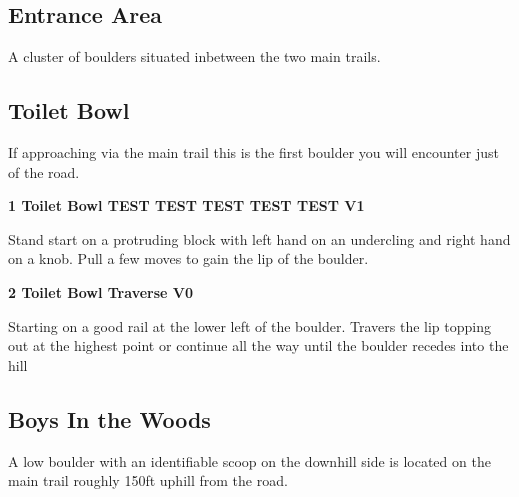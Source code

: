 \begin{multicols}{2}
		\section{Entrance Area}\label{sa:Entrance Area}
	\begin{minipage}{\columnwidth}
	A cluster of boulders situated inbetween the two main trails.
	\end{minipage}

			\subsection*{Toilet Bowl}\label{bf:Toilet Bowl}
			\begin{minipage}{\columnwidth}
			If approaching via the main trail this is the first boulder you will encounter just of the road.
			\end{minipage}
			

					\begin{minipage}{\linewidth}	
					\label{rt:Toilet Bowl TEST TEST TEST TEST TEST}
\colorbox{green!20}{
\textbf{
1 Toilet Bowl TEST TEST TEST TEST TEST V1   
}
}

					\begin{adjustwidth}{0.5cm}{}				
					Stand start on a protruding block with left hand on an undercling and right hand on a knob. Pull a few moves to gain the lip of the boulder.
					\end{adjustwidth}
					\end{minipage}
					\begin{minipage}{\linewidth}	
					\label{rt:Toilet Bowl Traverse}
\colorbox{green!20}{
\textbf{
2 Toilet Bowl Traverse V0    
}
}

					\begin{adjustwidth}{0.5cm}{}				
					Starting on a good rail at the lower left of the boulder. Travers the lip topping out at the highest point or continue all the way until the boulder recedes into the hill
					\end{adjustwidth}
					\end{minipage}
			\subsection*{Boys In the Woods}\label{bf:Boys In the Woods}
			\begin{minipage}{\columnwidth}
			A low boulder with an identifiable scoop on the downhill side is located on the main trail roughly 150ft uphill from the road.
			\end{minipage}
			

\end{multicols}
